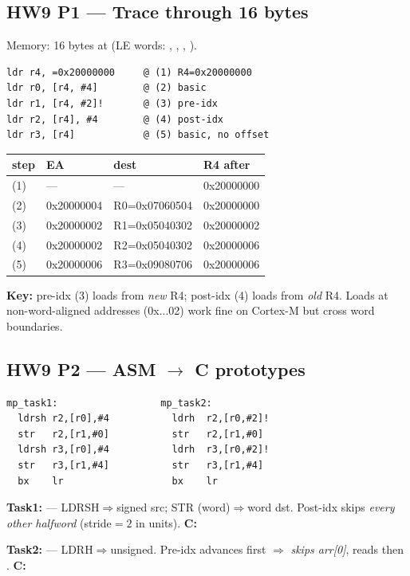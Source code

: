 \subsection{HW9 P1 --- Trace through 16 bytes}
Memory: 16 bytes  at  (LE words:
, ,
, ).
\begin{lstlisting}
ldr r4, =0x20000000     @ (1) R4=0x20000000
ldr r0, [r4, #4]        @ (2) basic
ldr r1, [r4, #2]!       @ (3) pre-idx
ldr r2, [r4], #4        @ (4) post-idx
ldr r3, [r4]            @ (5) basic, no offset
\end{lstlisting}
\begin{tabular}{@{}llll@{}}
\toprule
step & EA & dest & R4 after \\
\midrule
(1) & ---        & ---           & 0x20000000 \\
(2) & 0x20000004 & R0=0x07060504 & 0x20000000 \\
(3) & 0x20000002 & R1=0x05040302 & 0x20000002 \\
(4) & 0x20000002 & R2=0x05040302 & 0x20000006 \\
(5) & 0x20000006 & R3=0x09080706 & 0x20000006 \\
\bottomrule
\end{tabular}
\textbf{Key:} pre-idx (3) loads from \emph{new} R4; post-idx (4) loads
from \emph{old} R4. Loads at non-word-aligned addresses (0x...02) work
fine on Cortex-M but cross word boundaries.

\subsection{HW9 P2 --- ASM $\to$ C prototypes}
\begin{lstlisting}
mp_task1:                  mp_task2:
  ldrsh r2,[r0],#4           ldrh  r2,[r0,#2]!
  str   r2,[r1,#0]           str   r2,[r1,#0]
  ldrsh r3,[r0],#4           ldrh  r3,[r0,#2]!
  str   r3,[r1,#4]           str   r3,[r1,#4]
  bx    lr                   bx    lr
\end{lstlisting}
\textbf{Task1:}  ---
LDRSH$\Rightarrow$signed src; STR (word)$\Rightarrow$word dst.
Post-idx  skips \emph{every other halfword} (stride$=2$ in
 units).
\textbf{C:}  \newline {}

\textbf{Task2:}  ---
LDRH$\Rightarrow$unsigned. Pre-idx  advances first $\Rightarrow$
\emph{skips arr[0]}, reads  then .
\textbf{C:}  \newline {}

